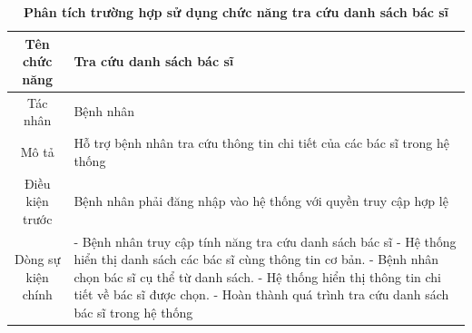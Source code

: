 \begin{table}[H]
	\caption{\bfseries \fontsize{12pt}{0pt}\selectfont Phân tích trường hợp sử dụng chức năng tra cứu danh sách bác sĩ}
	\centering
	\begin{tabularx}{0.9\textwidth}{|c|X|}
		\hline
		\textbf{Tên chức năng} & \textbf{Tra cứu danh sách bác sĩ}                                         \\
		\hline
		Tác nhân               & Bệnh nhân                                                                 \\
		\hline
		Mô tả                  & Hỗ trợ bệnh nhân tra cứu thông tin chi tiết của các bác sĩ trong hệ thống \\
		\hline
		Điều kiện trước        & Bệnh nhân phải đăng nhập vào hệ thống với quyền truy cập hợp lệ           \\
		\hline
		Dòng sự kiện chính     &
		- Bệnh nhân truy cập tính năng tra cứu danh sách bác sĩ \newline
		- Hệ thống hiển thị danh sách các bác sĩ cùng thông tin cơ bản. \newline
		- Bệnh nhân chọn bác sĩ cụ thể từ danh sách. \newline
		- Hệ thống hiển thị thông tin chi tiết về bác sĩ được chọn. \newline
		- Hoàn thành quá trình tra cứu danh sách bác sĩ trong hệ thống                                     \\
		\hline
	\end{tabularx}
\end{table}

